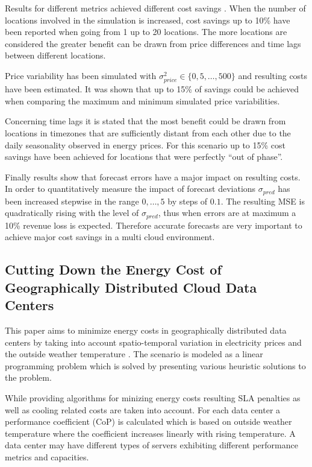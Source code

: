 Results for different metrics achieved different cost savings \cite{de2013study}. When the number of locations involved in the simulation is increased, cost savings up to 10\% have been reported when going from 1 up to 20 locations. The more locations are considered the greater benefit can be drawn from price differences and time lags between different locations. 

Price variability has been simulated with $\sigma_{price}^{2} \in \{0,5,\ldots,500\}$ and resulting costs have been estimated. It was shown that up to 15\% of savings could be achieved when comparing the maximum and minimum simulated price variabilities. 

Concerning time lags it is stated that the most benefit could be drawn from locations in timezones that are sufficiently distant from each other due to the daily seasonality observed in energy prices. For this scenario up to 15\% cost savings have been achieved for locations that were perfectly "`out of phase"'. 

Finally results show that forecast errors have a major impact on resulting costs. In order to quantitatively measure the impact of forecast deviations $\sigma_{pred}$ has been increased stepwise in the range $0,\ldots,5$ by steps of $0.1$.
The resulting MSE is quadratically rising with the level of $\sigma_{pred}$, thus when errors are at maximum a 10\% revenue loss is expected. 
Therefore accurate forecasts are very important to achieve major cost savings in a multi cloud environment. 




\subsection{Cutting Down the Energy Cost of Geographically Distributed Cloud Data Centers}

This paper aims to minimize energy costs in geographically distributed data centers by taking into account spatio-temporal variation in electricity prices and the outside weather temperature \cite{guler2013cutting}. The scenario is modeled as a linear programming problem which is solved by presenting various heuristic solutions to the problem. 

While providing algorithms for minizing energy costs resulting SLA penalties as well as cooling related costs are taken into account. 
For each data center a performance coefficient (CoP) is calculated which is based on outside weather temperature where the coefficient increases linearly with rising temperature. A data center may have different types of servers exhibiting different performance metrics and capacities. 

